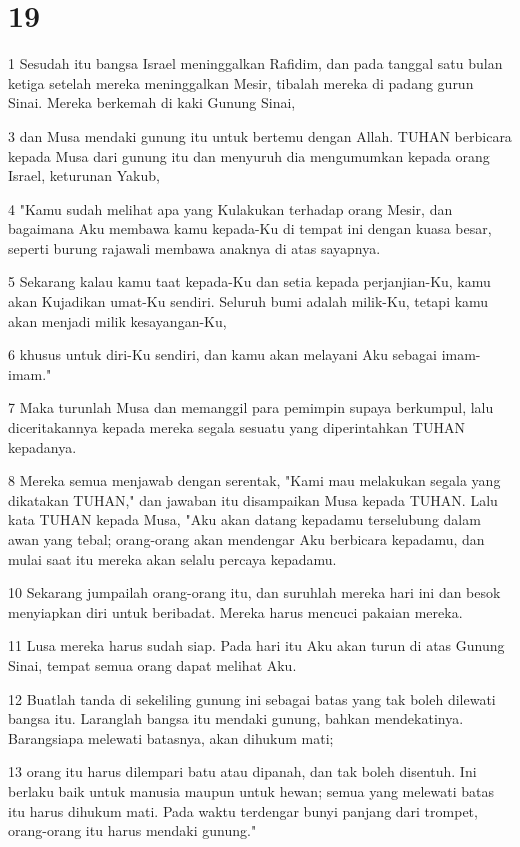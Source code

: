 \chapter{19}

\par 1 Sesudah itu bangsa Israel meninggalkan Rafidim, dan pada tanggal satu bulan ketiga setelah mereka meninggalkan Mesir, tibalah mereka di padang gurun Sinai. Mereka berkemah di kaki Gunung Sinai,
\par 3 dan Musa mendaki gunung itu untuk bertemu dengan Allah. TUHAN berbicara kepada Musa dari gunung itu dan menyuruh dia mengumumkan kepada orang Israel, keturunan Yakub,
\par 4 "Kamu sudah melihat apa yang Kulakukan terhadap orang Mesir, dan bagaimana Aku membawa kamu kepada-Ku di tempat ini dengan kuasa besar, seperti burung rajawali membawa anaknya di atas sayapnya.
\par 5 Sekarang kalau kamu taat kepada-Ku dan setia kepada perjanjian-Ku, kamu akan Kujadikan umat-Ku sendiri. Seluruh bumi adalah milik-Ku, tetapi kamu akan menjadi milik kesayangan-Ku,
\par 6 khusus untuk diri-Ku sendiri, dan kamu akan melayani Aku sebagai imam-imam."
\par 7 Maka turunlah Musa dan memanggil para pemimpin supaya berkumpul, lalu diceritakannya kepada mereka segala sesuatu yang diperintahkan TUHAN kepadanya.
\par 8 Mereka semua menjawab dengan serentak, "Kami mau melakukan segala yang dikatakan TUHAN," dan jawaban itu disampaikan Musa kepada TUHAN. Lalu kata TUHAN kepada Musa, "Aku akan datang kepadamu terselubung dalam awan yang tebal; orang-orang akan mendengar Aku berbicara kepadamu, dan mulai saat itu mereka akan selalu percaya kepadamu.
\par 10 Sekarang jumpailah orang-orang itu, dan suruhlah mereka hari ini dan besok menyiapkan diri untuk beribadat. Mereka harus mencuci pakaian mereka.
\par 11 Lusa mereka harus sudah siap. Pada hari itu Aku akan turun di atas Gunung Sinai, tempat semua orang dapat melihat Aku.
\par 12 Buatlah tanda di sekeliling gunung ini sebagai batas yang tak boleh dilewati bangsa itu. Laranglah bangsa itu mendaki gunung, bahkan mendekatinya. Barangsiapa melewati batasnya, akan dihukum mati;
\par 13 orang itu harus dilempari batu atau dipanah, dan tak boleh disentuh. Ini berlaku baik untuk manusia maupun untuk hewan; semua yang melewati batas itu harus dihukum mati. Pada waktu terdengar bunyi panjang dari trompet, orang-orang itu harus mendaki gunung."
